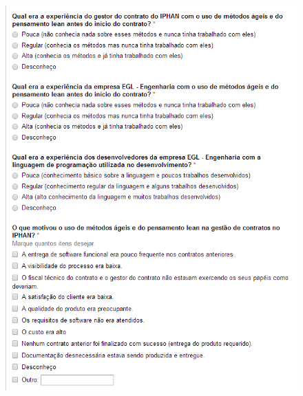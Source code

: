 \begin{apendicesenv}
\begin{figure}[H]
		\centering
			\includegraphics[scale=1.0]{figuras/quest4.png}

		\label{quest4}
\end{figure}


\end{apendicesenv}
